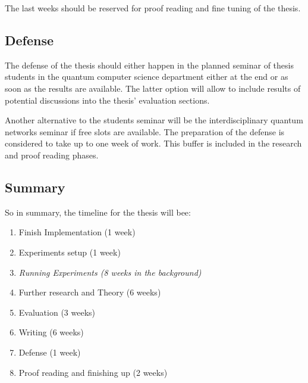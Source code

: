 The last weeks should be reserved for proof reading and fine tuning of the thesis. 

\subsection{Defense}
The defense of the thesis should either happen in the planned seminar of thesis students in the quantum computer
science department either at the end or as soon as the results are available. The latter option will allow to include 
results of potential discussions into the thesis' evaluation sections.

Another alternative to the students seminar will be the interdisciplinary quantum networks seminar if free slots are available. The preparation 
of the defense is considered to take up to one week of work. This buffer is included in the research and proof reading
phases.

\subsection{Summary}
So in summary, the timeline for the thesis will bee:

\begin{enumerate}
    \item Finish Implementation (1 week)
    \item Experiments setup (1 week)
    \item \textit{Running Experiments (8 weeks in the background)}
    \item Further research and Theory (6 weeks)
    \item Evaluation (3 weeks)
    \item Writing (6 weeks)
    \item Defense (1 week)
    \item Proof reading and finishing up (2 weeks)
\end{enumerate}